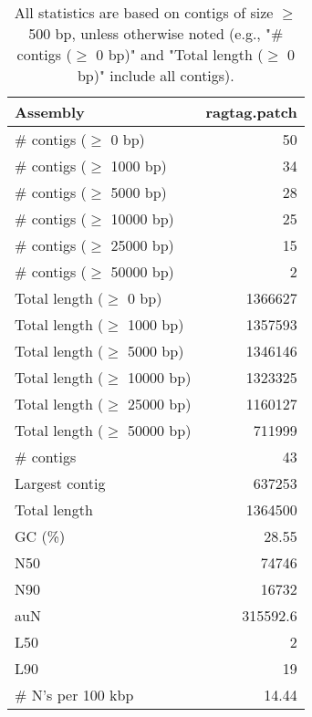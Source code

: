 \documentclass[12pt,a4paper]{article}
\begin{document}
\begin{table}[ht]
\begin{center}
\caption{All statistics are based on contigs of size $\geq$ 500 bp, unless otherwise noted (e.g., "\# contigs ($\geq$ 0 bp)" and "Total length ($\geq$ 0 bp)" include all contigs).}
\begin{tabular}{|l*{1}{|r}|}
\hline
Assembly & ragtag.patch \\ \hline
\# contigs ($\geq$ 0 bp) & 50 \\ \hline
\# contigs ($\geq$ 1000 bp) & 34 \\ \hline
\# contigs ($\geq$ 5000 bp) & 28 \\ \hline
\# contigs ($\geq$ 10000 bp) & 25 \\ \hline
\# contigs ($\geq$ 25000 bp) & 15 \\ \hline
\# contigs ($\geq$ 50000 bp) & 2 \\ \hline
Total length ($\geq$ 0 bp) & 1366627 \\ \hline
Total length ($\geq$ 1000 bp) & 1357593 \\ \hline
Total length ($\geq$ 5000 bp) & 1346146 \\ \hline
Total length ($\geq$ 10000 bp) & 1323325 \\ \hline
Total length ($\geq$ 25000 bp) & 1160127 \\ \hline
Total length ($\geq$ 50000 bp) & 711999 \\ \hline
\# contigs & 43 \\ \hline
Largest contig & 637253 \\ \hline
Total length & 1364500 \\ \hline
GC (\%) & 28.55 \\ \hline
N50 & 74746 \\ \hline
N90 & 16732 \\ \hline
auN & 315592.6 \\ \hline
L50 & 2 \\ \hline
L90 & 19 \\ \hline
\# N's per 100 kbp & 14.44 \\ \hline
\end{tabular}
\end{center}
\end{table}
\end{document}
